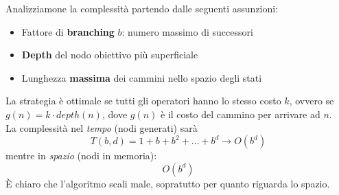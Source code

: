\noindent Analizziamone la complessità partendo dalle seguenti assunzioni:
\begin{itemize}
	\item Fattore di \textbf{branching} $b$: numero massimo di successori
	\item \textbf{Depth} del nodo obiettivo più superficiale
	\item Lunghezza \textbf{massima} dei cammini nello spazio degli stati
\end{itemize}
La strategia è ottimale se tutti gli operatori hanno lo stesso costo $k$, ovvero se $g(n)=k \cdot depth(n)$, dove $g(n)$ è il costo del cammino per arrivare ad $n$.\\
La complessità nel \emph{tempo} (nodi generati) sarà 
\begin{equation*}
	T(b,d)=1+b+b^2+\ldots+b^d \longrightarrow O(b^d)
\end{equation*}
mentre in \emph{spazio} (nodi in memoria):
\begin{equation*}
	O(b^d)
\end{equation*}
È chiaro che l'algoritmo scali male, sopratutto per quanto riguarda lo spazio.


